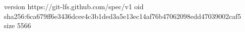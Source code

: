 version https://git-lfs.github.com/spec/v1
oid sha256:6ca679ff6e3436dcee4c3b1ded3a5e13ec14af76b47062098edd47039002caf5
size 5566
